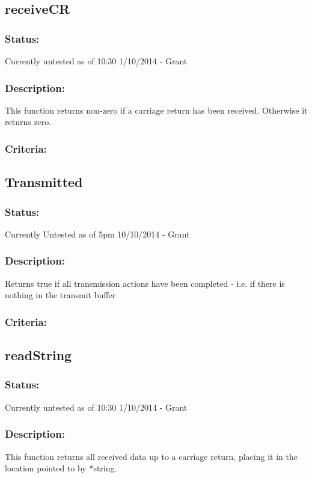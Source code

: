 \documentclass[]{report}
\begin{document}
\subsection{receiveCR}
\subsubsection{Status:}
Currently untested as of 10:30 1/10/2014 - Grant

\subsubsection{Description:}
This function returns non-zero if a carriage return has been received. Otherwise it returns zero.

\subsubsection{Criteria:}

\subsection{Transmitted}
\subsubsection{Status:}
Currently Untested as of 5pm 10/10/2014 - Grant

\subsubsection{Description:}
Returns true if all transmission actions have been completed - i.e. if there is nothing in the transmit buffer

\subsubsection{Criteria:}


\subsection{readString}
\subsubsection{Status:}
Currently untested as of 10:30 1/10/2014 - Grant

\subsubsection{Description:}
This function returns all received data up to a carriage return, placing it in the location pointed to by *string.
\end{document}
